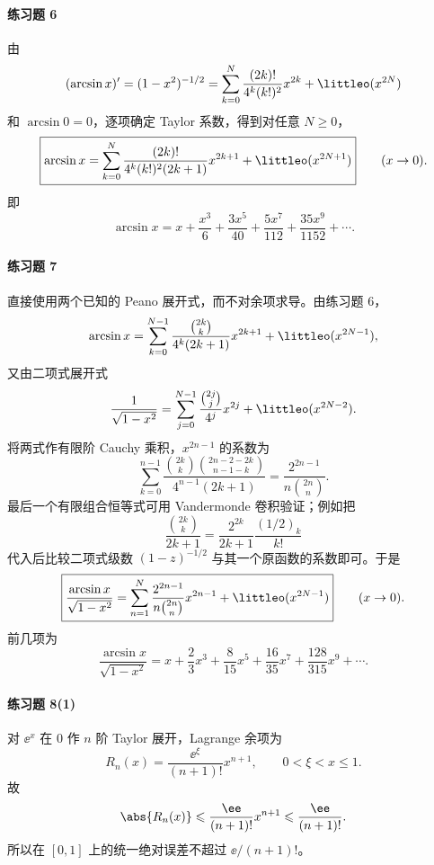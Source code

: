 \paragraph{练习题 6}
\begin{xsolution}
由
\[
  (\arcsin x)'=(1-x^2)^{-1/2}
  =\sum_{k=0}^N\frac{(2k)!}{4^k(k!)^2}x^{2k}
   +\littleo(x^{2N})
\]
和 $\arcsin0=0$，逐项确定 Taylor 系数，得到对任意 $N\geqslant0$，
\[
  \boxed{
  \arcsin x
  =\sum_{k=0}^N
    \frac{(2k)!}{4^k(k!)^2(2k+1)}x^{2k+1}
   +\littleo(x^{2N+1})
  }
  \qquad(x\to0).
\]
即
\[
  \arcsin x
  =x+\frac{x^3}{6}+\frac{3x^5}{40}
   +\frac{5x^7}{112}+\frac{35x^9}{1152}+\cdots.
\]
\end{xsolution}

\paragraph{练习题 7}
\begin{xsolution}
直接使用两个已知的 Peano 展开式，而不对余项求导。由练习题 6，
\[
  \arcsin x
  =\sum_{k=0}^{N-1}
    \frac{\binom{2k}{k}}{4^k(2k+1)}x^{2k+1}
   +\littleo(x^{2N-1}),
\]
又由二项式展开式
\[
  \frac1{\sqrt{1-x^2}}
  =\sum_{j=0}^{N-1}\frac{\binom{2j}{j}}{4^j}x^{2j}
   +\littleo(x^{2N-2}).
\]
将两式作有限阶 Cauchy 乘积，$x^{2n-1}$ 的系数为
\[
  \sum_{k=0}^{n-1}
  \frac{\binom{2k}{k}\binom{2n-2-2k}{n-1-k}}
       {4^{n-1}(2k+1)}
  =\frac{2^{2n-1}}{n\binom{2n}{n}}.
\]
最后一个有限组合恒等式可用 Vandermonde 卷积验证；例如把
\[
  \frac{\binom{2k}{k}}{2k+1}
  =\frac{2^{2k}}{2k+1}\frac{(1/2)_k}{k!}
\]
代入后比较二项式级数
$(1-z)^{-1/2}$ 与其一个原函数的系数即可。于是
\[
  \boxed{
  \frac{\arcsin x}{\sqrt{1-x^2}}
  =\sum_{n=1}^N
    \frac{2^{2n-1}}{n\binom{2n}{n}}x^{2n-1}
  +\littleo(x^{2N-1})
  }
  \qquad(x\to0).
\]
前几项为
\[
  \frac{\arcsin x}{\sqrt{1-x^2}}
  =x+\frac23x^3+\frac{8}{15}x^5
   +\frac{16}{35}x^7+\frac{128}{315}x^9+\cdots.
\]
\end{xsolution}

\paragraph{练习题 8(1)}
\begin{xsolution}
对 $\ee^x$ 在 $0$ 作 $n$ 阶 Taylor 展开，Lagrange 余项为
\[
  R_n(x)=\frac{\ee^\xi}{(n+1)!}x^{n+1},
  \qquad0<\xi<x\leqslant1.
\]
故
\[
  \abs{R_n(x)}
  \leqslant\frac{\ee}{(n+1)!}x^{n+1}
  \leqslant\frac{\ee}{(n+1)!}.
\]
所以在 $[0,1]$ 上的统一绝对误差不超过 $\ee/(n+1)!$。
\end{xsolution}

